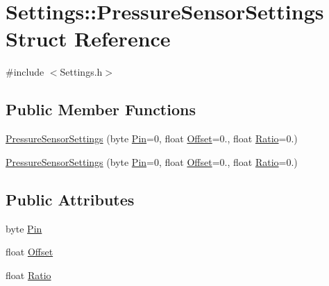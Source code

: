 \hypertarget{struct_settings_1_1_pressure_sensor_settings}{}\section{Settings\+:\+:Pressure\+Sensor\+Settings Struct Reference}
\label{struct_settings_1_1_pressure_sensor_settings}


{\ttfamily \#include $<$Settings.\+h$>$}

\subsection*{Public Member Functions}
\begin{DoxyCompactItemize}
\item 
\hyperlink{struct_settings_1_1_pressure_sensor_settings_a1354ebc3182bec156453a5ea5912a55f}{Pressure\+Sensor\+Settings} (byte \hyperlink{struct_settings_1_1_pressure_sensor_settings_aba6b47901fe5400f422027a80dc34f48}{Pin}=0, float \hyperlink{struct_settings_1_1_pressure_sensor_settings_a3f9d1ad6b96c4509b75c579804e3839d}{Offset}=0., float \hyperlink{struct_settings_1_1_pressure_sensor_settings_af7d412b16511d8a0381ff59788b4c781}{Ratio}=0.)
\item 
\hyperlink{struct_settings_1_1_pressure_sensor_settings_a1354ebc3182bec156453a5ea5912a55f}{Pressure\+Sensor\+Settings} (byte \hyperlink{struct_settings_1_1_pressure_sensor_settings_aba6b47901fe5400f422027a80dc34f48}{Pin}=0, float \hyperlink{struct_settings_1_1_pressure_sensor_settings_a3f9d1ad6b96c4509b75c579804e3839d}{Offset}=0., float \hyperlink{struct_settings_1_1_pressure_sensor_settings_af7d412b16511d8a0381ff59788b4c781}{Ratio}=0.)
\end{DoxyCompactItemize}
\subsection*{Public Attributes}
\begin{DoxyCompactItemize}
\item 
byte \hyperlink{struct_settings_1_1_pressure_sensor_settings_aba6b47901fe5400f422027a80dc34f48}{Pin}
\item 
float \hyperlink{struct_settings_1_1_pressure_sensor_settings_a3f9d1ad6b96c4509b75c579804e3839d}{Offset}
\item 
float \hyperlink{struct_settings_1_1_pressure_sensor_settings_af7d412b16511d8a0381ff59788b4c781}{Ratio}
\end{DoxyCompactItemize}


